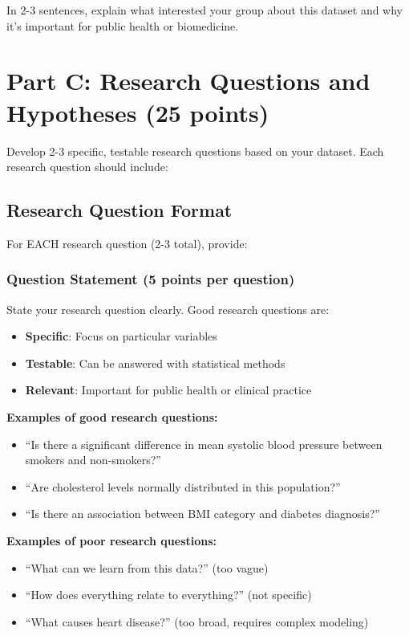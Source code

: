 \documentclass[11pt]{article}
\begin{document}
In 2-3 sentences, explain what interested your group about this dataset and why it's important for public health or biomedicine.

\newpage

\section{Part C: Research Questions and Hypotheses (25 points)}

Develop 2-3 specific, testable research questions based on your dataset. Each research question should include:

\subsection{Research Question Format}

For EACH research question (2-3 total), provide:

\subsubsection{Question Statement (5 points per question)}

State your research question clearly. Good research questions are:
\begin{itemize}
\item \textbf{Specific}: Focus on particular variables
\item \textbf{Testable}: Can be answered with statistical methods
\item \textbf{Relevant}: Important for public health or clinical practice
\end{itemize}

\textbf{Examples of good research questions:}
\begin{itemize}
\item ``Is there a significant difference in mean systolic blood pressure between smokers and non-smokers?''
\item ``Are cholesterol levels normally distributed in this population?''
\item ``Is there an association between BMI category and diabetes diagnosis?''
\end{itemize}

\textbf{Examples of poor research questions:}
\begin{itemize}
\item ``What can we learn from this data?'' (too vague)
\item ``How does everything relate to everything?'' (not specific)
\item ``What causes heart disease?'' (too broad, requires complex modeling)
\end{itemize}
\end{document}

